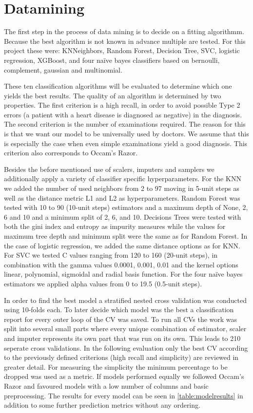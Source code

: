 \section{Datamining} \label{sec:datamining}
The first step in the process of data mining is to decide on a fitting algorithmm. Because the best algorithm is not known in advance multiple are tested. For this project these were: KNNeighbors, Random Forest, Decision Tree, SVC, logistic regression, XGBoost, and four naïve bayes classifiers based on bernoulli, complement, gaussian  and multinomial.

These ten classification algorithms will be evaluated to determine which one yields the best results. The quality of an algorithm is determined by two properties. The first criterion is a high recall, in order to avoid possible Type 2 errors (a patient with a heart disease is diagnosed as negative) in the diagnosis. The second criterion is the number of examinations required. The reason for this is that we want our model to be universally used by doctors. We assume that this is especially the case when even simple examinations yield a good diagnosis. This criterion also corresponds to Occam’s Razor.

Besides the before mentioned use of scalers, imputers and samplers we additionally apply a variety of classifier specific hyperparameters. For the KNN we added the number of used neighbors from 2 to 97 moving in 5-unit steps as well as the distance metric L1 and L2 as hyperparameters. Random Forest was tested with 10 to 90 (10-unit steps) estimators and a maximum depth of None, 2, 6 and 10 and a minimum split of 2, 6, and 10. Decisions Trees were tested with both the gini index and entropy as impurity measures while the values for maximum tree depth and minimum split were the same as for Random Forest. In the case of logistic regression, we added the same distance options as for KNN. For SVC we tested C values ranging from 120 to 160 (20-unit steps), in combination with the gamma values 0.0001, 0.001, 0.01 and the kernel options linear, polynomial, sigmoidal and radial basis function. For the four naïve bayes estimators we applied alpha values from 0 to 19.5 (0.5-unit steps).

In order to find the best model a stratified nested cross validation was conducted using 10-folds each. To later decide which model was the best a classification report for every outer loop of the CV was saved. To run all CVs the work was split into several small parts where every unique combination of estimator, scaler and imputer represents its own part that was run on its own. This leads to 210 seperate cross validations. In the following evaluation only the best CV according to the previously defined criterions (high recall and simplicity) are reviewed in greater detail. For measuring the simplicity the minimum percentage to be dropped was used as a metric. If models performed equally we followed Occam's Razor and favoured models with a low number of columns and basic preprocessing. The results for every model can be seen in \cref{table:modelresults} in addition to some further prediction metrics without any ordering.


